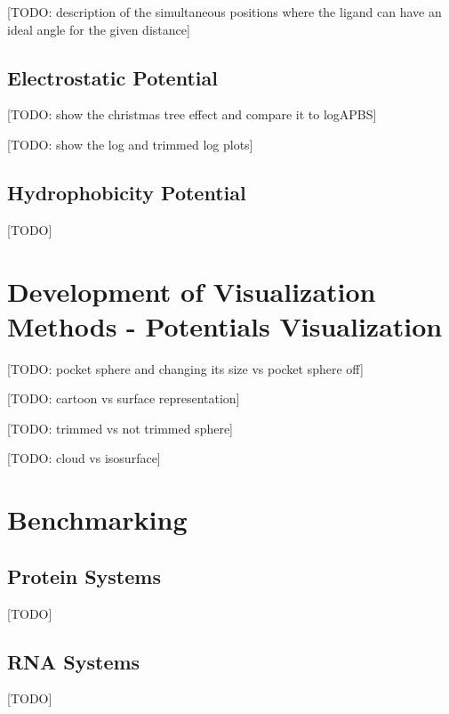     [TODO: description of the simultaneous positions where the ligand can have an ideal angle for the given distance]

  \subsection{Electrostatic Potential}
    [TODO: show the christmas tree effect and compare it to logAPBS]

    [TODO: show the log and trimmed log plots]

  \subsection{Hydrophobicity Potential}
    [TODO]


\section{Development of Visualization Methods - Potentials Visualization}
  [TODO: pocket sphere and changing its size vs pocket sphere off]

  [TODO: cartoon vs surface representation]

  [TODO: trimmed vs not trimmed sphere]

  [TODO: cloud vs isosurface]


\section{Benchmarking}
  \subsection{Protein Systems}
    [TODO]

  \subsection{RNA Systems}
    [TODO]


